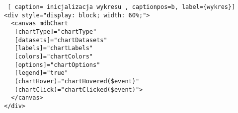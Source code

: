 \begin{lstlisting} [ caption= inicjalizacja wykresu , captionpos=b, label={wykres}]
<div style="display: block; width: 60%;">
  <canvas mdbChart
   [chartType]="chartType"
   [datasets]="chartDatasets"
   [labels]="chartLabels"
   [colors]="chartColors"
   [options]="chartOptions"
   [legend]="true"
   (chartHover)="chartHovered($event)"
   (chartClick)="chartClicked($event)">
  </canvas>
</div>
\end{lstlisting}